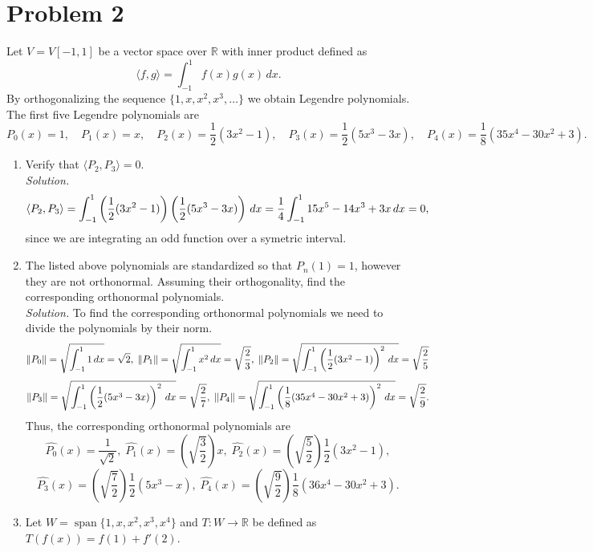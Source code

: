 \documentclass[12pt]{article}
\begin{document}
\section*{Problem 2}
Let \(V = V[-1, 1]\) be a vector space over \(\mathbb{R}\) with inner product defined as 
\[
\langle f, g \rangle = \int_{-1}^{1} f(x)g(x) \, dx.
\]
By orthogonalizing the sequence \(\{1, x, x^{2}, x^{3}, \dots\}\) we obtain Legendre polynomials. The first five Legendre polynomials are 
\[
P_{0}(x) = 1,\quad P_{1}(x) = x,\quad P_{2}(x) = \frac{1}{2}(3x^{2} - 1),\quad P_{3}(x) = \frac{1}{2}(5x^{3} - 3x),\quad P_{4}(x) = \frac{1}{8}(35x^{4} - 30x^{2} + 3).
\]

\begin{enumerate}
    \item[(a)] Verify that \(\langle P_{2}, P_{3} \rangle = 0\).\\
    \textit{Solution.}
	\[
		\left\langle P_2, P_3 \right\rangle=\int_{-1}^{1} \left(\frac{1}{2}(3x^{2} - 1)\right)\left(\frac{1}{2}(5x^{3}-3x)\right) \, dx=\frac{1}{4}\int_{-1}^{1} 15x^5-14x^3+3x\,dx=0,
	\]
	since we are integrating an odd function over a symetric interval.
    \item[(b)] The listed above polynomials are standardized so that \(P_{n}(1) = 1\), however they are not orthonormal. Assuming their orthogonality, find the corresponding orthonormal polynomials.\\
    \textit{Solution.} To find the corresponding orthonormal polynomials we need to divide the polynomials by their norm.
	\[
		\| P_0 \|=\sqrt{\int_{-1}^{1}1\,dx}=\sqrt{2},\; \| P_1 \|=\sqrt{\int_{-1}^{1}x^2\,dx}=\sqrt{\frac{2}{3}},\;\| P_2 \|=\sqrt{\int_{-1}^{1}\left(\frac{1}{2}(3x^{2} - 1)\right)^2\,dx}=\sqrt{\frac{2}{5}}
	\]
	\[
		\| P_3 \|=\sqrt{\int_{-1}^{1}\left(\frac{1}{2}(5x^{3} - 3x)\right)^2\,dx}=\sqrt{\frac{2}{7}},\;\| P_4 \|=\sqrt{\int_{-1}^{1}\left(\frac{1}{8}(35x^{4} - 30x^{2} + 3)\right)^2\,dx}=\sqrt{\frac{2}{9}}.
	\]
	Thus, the corresponding orthonormal polynomials are 
	\[
		\hat{P_0}(x)=\frac{1}{\sqrt{2}},\;\hat{P_1}(x)=\left(\sqrt{\frac{3}{2}}\right)x,\;\hat{P_2}(x)=\left(\sqrt{\frac{5}{2}}\right)\frac{1}{2}(3x^{2} - 1),
	\]
	\[
		\hat{P_3}(x)=\left(\sqrt{\frac{7}{2}}\right)\frac{1}{2}(5x^{3} - x),\;\hat{P_4}(x)=\left(\sqrt{\frac{9}{2}}\right)\frac{1}{8}(36x^{4} - 30x^{2} + 3).
	\]
    \item[(c)] Let \(W = \operatorname{span}\{1, x, x^{2}, x^{3}, x^{4}\}\) and \(T: W \to \mathbb{R}\) be defined as \(T(f(x)) = f(1) + f'(2)\).\\
	\begin{enumerate}

\end{enumerate}
\end{enumerate}
\end{document}
